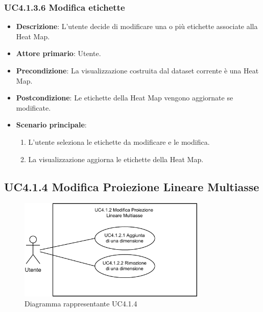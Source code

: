 \subsubsection{UC4.1.3.6 Modifica etichette}
\label{subsec:uc4.1.3.6}
\begin{itemize}
    \item \textbf{Descrizione}: L’utente decide di modificare una o più etichette associate alla Heat Map.

    \item \textbf{Attore primario}: Utente.
    
    \item \textbf{Precondizione}:   La visualizzazione costruita dal dataset corrente è una Heat Map.
    \item \textbf{Postcondizione}:  Le etichette della Heat Map vengono aggiornate se modificate.
	\item \textbf{Scenario principale}:
        \begin{enumerate}
            \item   L'utente seleziona le etichette da modificare e le modifica.
            \item   La visualizzazione aggiorna le etichette della Heat Map. %
        \end{enumerate}
\end{itemize}



\newpage
\subsection{UC4.1.4 Modifica Proiezione Lineare Multiasse}
\label{subsec:uc4.1.4}
\begin{figure}[h]
    \centering
    \includegraphics[width=0.8\textwidth]{componenti/casi-duso/diagrammi/UC4.1.4.pdf}
    \caption{Diagramma rappresentante UC4.1.4}
    \label{fig:UC4.1.4}
\end{figure}


